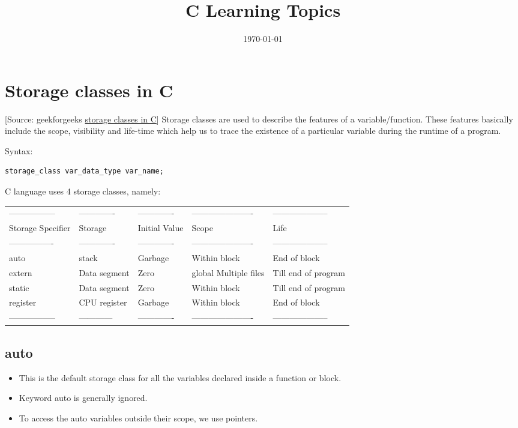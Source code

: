 \documentclass[11pt]{article}
\date{\today}
\title{C Learning Topics}
\begin{document}
\maketitle
\tableofcontents


\section{Storage classes in C}
\label{sec:org9be4cea}
[Source: geekforgeeks \href{https://www.google.com/url?client=internal-uds-cse\&cx=009682134359037907028:tj6eafkv\_be\&q=https://www.geeksforgeeks.org/storage-classes-in-c/\&sa=U\&ved=2ahUKEwi9t8CGyu\_hAhVHzaQKHcg2BqoQFjAAegQIBhAB\&usg=AOvVaw3qgAeah-xn-P8-ii93oDtq}{storage classes in C}]
Storage classes are used to describe the features of a
variable/function. These features basically include the scope,
visibility and life-time which help us to trace the existence of a
particular variable during the runtime of a program.

Syntax:
\begin{verbatim}
storage_class var_data_type var_name;
\end{verbatim}

C language uses 4 storage classes, namely:
\begin{center}
\begin{tabular}{lllll}
----------------- & ------------- & ------------- & ---------------------- & --------------------\\
Storage Specifier & Storage & Initial Value & Scope & Life\\
---------------- & ------------- & ------------- & ---------------------- & --------------------\\
auto & stack & Garbage & Within block & End of block\\
extern & Data segment & Zero & global Multiple files & Till end of program\\
static & Data segment & Zero & Within block & Till end of program\\
register & CPU register & Garbage & Within block & End of block\\
----------------- & ------------ & ------------- & ---------------------- & --------------------\\
\end{tabular}
\end{center}

\subsection{auto}
\label{sec:org3c7ee9e}
\begin{itemize}
\item This is the default storage class for all the variables declared
inside a function or block.
\item Keyword auto is generally ignored.
\item To access the auto variables outside their scope, we use pointers.
\end{itemize}
\end{document}
